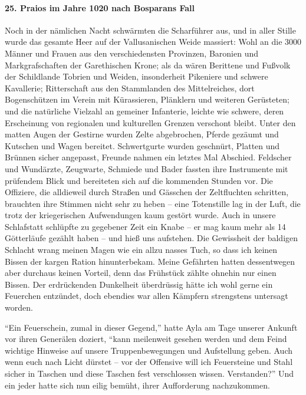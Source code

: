 \paragraph{25. Praios im Jahre 1020 nach Bosparans Fall}
Noch in der nämlichen Nacht schwärmten die Scharführer aus, und in aller Stille wurde das gesamte Heer auf der Vallusanischen Weide massiert: Wohl an die 3000 Männer und Frauen aus den verschiedensten Provinzen, Baronien und Markgrafschaften der Garethischen Krone; als da wären Berittene und Fußvolk der Schildlande Tobrien und Weiden, insonderheit Pikeniere und schwere Kavallerie; Ritterschaft aus den Stammlanden des Mittelreiches, dort Bogenschützen im Verein mit Kürassieren, Plänklern und weiteren Gerüsteten; und die natürliche Vielzahl an gemeiner Infanterie, leichte wie schwere, deren Erscheinung von regionalen und kulturellen Grenzen verschont bleibt. Unter den matten Augen der Gestirne wurden Zelte abgebrochen, Pferde gezäumt und Kutschen und Wagen bereitet. Schwertgurte wurden geschnürt, Platten und Brünnen sicher angepasst, Freunde nahmen ein letztes Mal Abschied. Feldscher und Wundärzte, Zeugwarte, Schmiede und Bader fassten ihre Instrumente mit prüfendem Blick und bereiteten sich auf die kommenden Stunden vor. Die Offiziere, die alldieweil durch Straßen und Gässchen der Zeltfluchten schritten, brauchten ihre Stimmen nicht sehr zu heben -- eine Totenstille lag in der Luft, die trotz der kriegerischen Aufwendungen kaum gestört wurde. Auch in unsere Schlafstatt schlüpfte zu gegebener Zeit ein Knabe -- er mag kaum mehr als 14 Götterläufe gezählt haben -- und hieß uns aufstehen. Die Gewissheit der baldigen Schlacht wrang meinen Magen wie ein allzu nasses Tuch, so dass ich keinen Bissen der kargen Ration hinunterbekam. Meine Gefährten hatten dessentwegen aber durchaus keinen Vorteil, denn das Frühstück zählte ohnehin nur einen Bissen. Der erdrückenden Dunkelheit überdrüssig hätte ich wohl gerne ein Feuerchen entzündet, doch ebendies war allen Kämpfern strengstens untersagt worden.

``Ein Feuerschein, zumal in dieser Gegend,'' hatte Ayla am Tage unserer Ankunft vor ihren Generälen doziert, ``kann meilenweit gesehen werden und dem Feind wichtige Hinweise auf unsere Truppenbewegungen und Aufstellung geben. Auch wenn euch nach Licht dürstet -- vor der Offensive will ich Feuersteine und Stahl sicher in Taschen und diese Taschen fest verschlossen wissen. Verstanden?''
Und ein jeder hatte sich nun eilig bemüht, ihrer Aufforderung nachzukommen.

